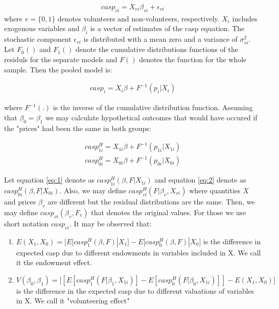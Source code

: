 \documentclass[10pt, letterpaper]{article}
\begin{document}
\begin{spacing}{1.4}
  \begin{eqnarray}
	casp_{vi}= X_{vi}\beta_{vi}+ \epsilon_{vi}
 \end{eqnarray}
where $v=\big\{0,1\big\}$ denotes volunteers and non-volunteers, respectively. $X_{i}$ includes exogenous variables and $\beta_{i}$ is a vector of estimates of the casp equation. The stochastic component $\epsilon_{vi}$ is distributed with a mean zero and a variance of $\sigma_{vi}^{2}$. Let $F_{0}()$ and $F_{1}()$ denote  the cumulative distributions functions of the residuls for the separate models and $F()$ denotes the function for the whole sample. Then the pooled model is:  

  \begin{eqnarray}
	casp_{i}= X_{i}\beta+ F^{-1}(p_{i}|X_{i})
 \end{eqnarray}

where $F^{-1}(.)$ is the inverse of the cumulative distribution function. Assuming that $\beta_{0}=\beta_{1}$ we may calculate hypothetical outcomes that would have occured if the "prices" had been the same in both groups:

  \begin{eqnarray} 
	casp^{H}_{1i}= X_{1i}\beta+ F^{-1}(p_{1i}|X_{1i}) \label{eq:1} \\
	casp^{H}_{0i}= X_{0i}\beta+ F^{-1}(p_{0i}|X_{0i}) \label{eq:2}
 \end{eqnarray}

Let equation \ref{eq:1} denote as $casp^{H}_{1i}(\beta,F|X_{1i})$ and equation \ref{eq:2} denote as $casp^{H}_{0i}(\beta,F|X_{0i})$. Also, we may define $casp^{H}_{vi}(F|\beta_{v},X_{vi})$ where quantities $X$ and prices $ \beta_{v}$ are different but the residual distributions are the same. Then, we may define $ casp_{vi}(\beta_{v},F_{v})$ that denotes the original values. For those we use short notation  $casp_{vi}$. It may be observed that:

\begin{enumerate}

\item  $ E(X_{1},X_{0})=\bigg[E[casp^{H}_{1}(\beta,F)|X_{1}]-E[casp^{H}_{0}(\beta,F)|X_{0}\bigg]$ is the difference in expected casp due to different endowments in variables included in X. We call it the endowment effect. 

\item $ V(\beta_{0},\beta_{1}) =\bigg[ [E[casp^{H}_{1}(F|\beta_{1},X_{1i})]- E[casp^{H}_{0}(F|\beta_{0},X_{1i})]] -E(X_{1},X_{0})\bigg]$ is the difference in the expected casp due to different valuations of variables in X. We call it "volunteering effect"


\end{enumerate}
\end{spacing}
\end{document}
